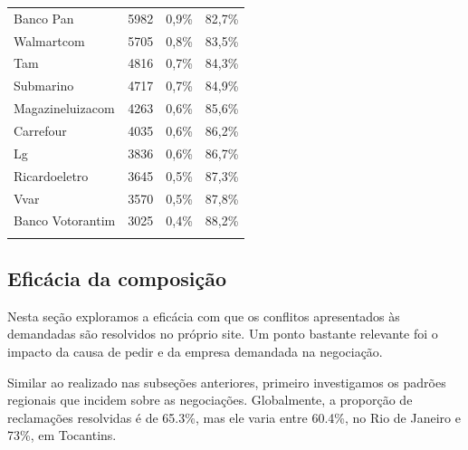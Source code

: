 \documentclass[]{report}
\begin{document}
\begin{longtable}{lrll}
  Banco Pan & 5982 & 0,9\% & 82,7\% \\
  Walmartcom & 5705 & 0,8\% & 83,5\% \\
  Tam & 4816 & 0,7\% & 84,3\% \\
  Submarino & 4717 & 0,7\% & 84,9\% \\
  Magazineluizacom & 4263 & 0,6\% & 85,6\% \\
  Carrefour & 4035 & 0,6\% & 86,2\% \\
  Lg & 3836 & 0,6\% & 86,7\% \\
  Ricardoeletro & 3645 & 0,5\% & 87,3\% \\
  Vvar & 3570 & 0,5\% & 87,8\% \\
  Banco
Votorantim & 3025 & 0,4\% & 88,2\% \\
   \hline
\hline
\label{unnamed-chunk-96}
\end{longtable}

\subsection{Eficácia da composição}\label{eficacia-da-composicao}

Nesta seção exploramos a eficácia com que os conflitos apresentados às
demandadas são resolvidos no próprio site. Um ponto bastante relevante
foi o impacto da causa de pedir e da empresa demandada na negociação.

Similar ao realizado nas subseções anteriores, primeiro investigamos os
padrões regionais que incidem sobre as negociações. Globalmente, a
proporção de reclamações resolvidas é de 65.3\%, mas ele varia entre
60.4\%, no Rio de Janeiro e 73\%, em Tocantins.
\end{document}

